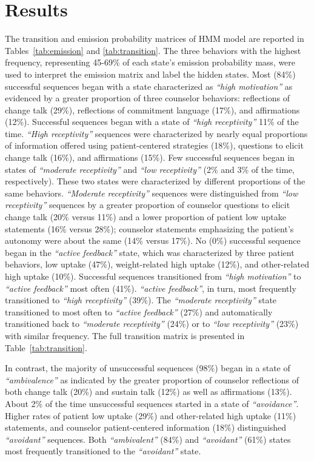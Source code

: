 \section{Results}
\label{sec:results}
The transition and emission probability matrices of HMM model are reported in Tables~\ref{tab:emission} and \ref{tab:transition}. The three behaviors with the highest frequency, representing 45-69\% of each state's emission probability mass, were used to interpret the emission matrix and label the hidden states. Most (84\%) successful sequences began with a state characterized as \textit{``high motivation''} as evidenced by a greater proportion of three counselor behaviors: reflections of change talk (29\%), reflections of commitment language (17\%), and affirmations (12\%). Successful sequences began with a state of \textit{``high receptivity''} 11\% of the time. \textit{``High receptivity''} sequences were characterized by nearly equal proportions of information offered using patient-centered strategies (18\%), questions to elicit change talk (16\%), and affirmations (15\%). Few successful sequences began in states of \textit{``moderate receptivity''} and \textit{``low receptivity''} (2\% and 3\% of the time, respectively). These two states were characterized by different proportions of the same behaviors. \textit{``Moderate receptivity''} sequences were distinguished from \textit{``low receptivity''} sequences by a greater proportion of counselor questions to elicit change talk (20\% versus 11\%) and a lower proportion of patient low uptake statements (16\% versus 28\%); counselor statements emphasizing the patient's autonomy were about the same (14\% versus 17\%). No (0\%) successful sequence began in the \textit{``active feedback''} state, which was characterized by three patient behaviors, low uptake (47\%), weight-related high uptake (12\%), and other-related high uptake (10\%). Successful sequences transitioned from \textit{``high motivation''} to \textit{``active feedback''} most often (41\%). \textit{``active feedback''}, in turn, most frequently transitioned to \textit{``high receptivity''} (39\%). The \textit{``moderate receptivity''} state transitioned to most often to \textit{``active feedback''} (27\%) and automatically transitioned back to \textit{``moderate receptivity''} (24\%) or to \textit{``low receptivity''} (23\%) with similar frequency. The full transition matrix is presented in Table~\ref{tab:transition}.

In contrast, the majority of unsuccessful sequences (98\%) began in a state of \textit{``ambivalence''} as indicated by the greater proportion of counselor reflections of both change talk (20\%) and sustain talk (12\%) as well as affirmations (13\%). About 2\% of the time unsuccessful sequences started in a state of \textit{``avoidance''}. Higher rates of patient low uptake (29\%) and other-related high uptake (11\%) statements, and counselor patient-centered information (18\%) distinguished \textit{``avoidant''} sequences. Both \textit{``ambivalent''} (84\%) and \textit{``avoidant''} (61\%) states most frequently transitioned to the \textit{``avoidant''} state.

